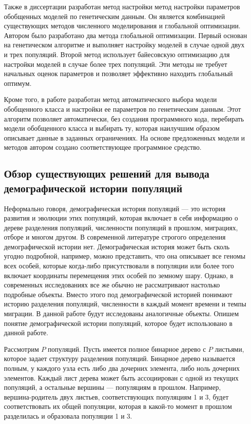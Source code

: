 \documentclass[a4paper,14pt,oneside,openany,article]{memoir}
\begin{document}
Также в диссертации разработан метод настройки метод настройки параметров обобщенных моделей по генетическим данным.
Он является комбинацией существующих методов численного моделирования и глобальной оптимизации.
Автором было разработано два метода глобальной оптимизации. 
Первый основан на генетическом алгоритме и выполняет настройку моделей в случае одной двух и трех популяций.
Второй метод использует байесовскую оптимизацию для настройки моделей в случае более трех популяций.
Эти методы не требует начальных оценок параметров и позволяет эффективно находить глобальный оптимум.

Кроме того, в работе разработан метод автоматического выбора модели обобщенного класса и настройки ее параметров по генетическим данным. Этот алгоритм позволяет автоматически, без создания программного кода, перебирать модели обобщенного класса и выбирать ту, которая наилучшим образом описывает данные в заданных ограничениях.
На основе предложенных модели и методов автором создано соответствующее программное средство.

\subsection*{Обзор существующих решений для вывода демографической истории популяций}

Неформально говоря, демографическая история популяций --- это история развития и эволюции этих популяций, которая включает в себя информацию о дереве разделения популяций, численности популяций в прошлом, миграциях, отборе и многом другом.
В современной литературе строгого определения демографической истории нет.
Демографическая история может быть сколь угодно подробной, например, можно представить, что она описывает все геномы всех особей, которые когда-либо присутствовали в популяции или более того включает координаты перемещения этих особей по земному шару.
Однако, в современных исследованиях все же обычно не рассматривают настолько подробные объекты.
Вместо этого под демографической историей понимают историю разделения популяций, численности в каждый момент времени и темпы миграции.
В данной работе будут исследованы аналогичные объекты.
Опишем понятие демографической истории популяций, которое будет использовано в данной работе.

Рассмотрим $P$ популяций.
Пусть имеется полное бинарное дерево с $P$ листьями, которое задает структуру разделения популяций.
Бинарное дерево называется полным, у каждого узла есть либо два дочерних элемента, либо ноль дочерних элементов.
Каждый лист дерева может быть ассоциирован с одной из текущих популяций, а остальные вершины --- популяциям в прошлом.
Например, вершина-родитель двух листьев, соответствующих популяциям 1 и 3, будет соответствовать их общей популяции, которая в какой-то момент в прошлом разделилась и образовала популяции 1 и 3.
\end{document}
